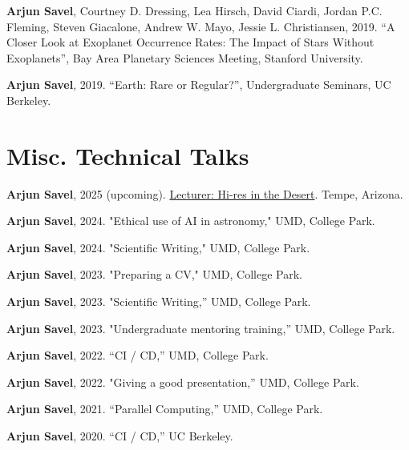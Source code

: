 \documentclass[letterpaper,10.5pt]{article}
\newcommand{\shorterSection}[1]{\vspace{-10pt}\section{#1}}
\begin{document}
\begin{list}{}{\cvlist}
\item[{\color{numcolor}\scriptsize2}] \textbf{Arjun Savel}, Courtney D. Dressing, Lea Hirsch, David Ciardi, Jordan P.C. Fleming, Steven Giacalone, Andrew W. Mayo, Jessie L. Christiansen, 2019. “A Closer Look at Exoplanet Occurrence Rates: The Impact of Stars Without Exoplanets”, Bay Area Planetary Sciences Meeting, Stanford University.

\item[{\color{numcolor}\scriptsize1}] \textbf{Arjun Savel}, 2019. “Earth: Rare or Regular?”, Undergraduate Seminars, UC Berkeley.

\end{list}

\shorterSection{Misc. Technical Talks}

\small
  \begin{list}{}{\cvlist}
    \item[{\color{numcolor}\scriptsize10}]
\textbf{Arjun Savel}, 2025 (upcoming). \href{https://sites.google.com/asu.edu/hi-res-in-the-desert}{Lecturer: Hi-res in the Desert}. Tempe, Arizona.
  \item[{\color{numcolor}\scriptsize9}]
\textbf{Arjun Savel}, 2024. "Ethical use of AI in astronomy," UMD, College Park.
  \item[{\color{numcolor}\scriptsize8}]
\textbf{Arjun Savel}, 2024. "Scientific Writing," UMD, College Park.
\item[{\color{numcolor}\scriptsize7}] 
\textbf{Arjun Savel}, 2023. "Preparing a CV," UMD, College Park.\item[{\color{numcolor}\scriptsize6}]
\textbf{Arjun Savel}, 2023. "Scientific Writing,” UMD, College Park.\item[{\color{numcolor}\scriptsize5}] \textbf{Arjun Savel}, 2023. "Undergraduate mentoring training,” UMD, College Park.
  \item[{\color{numcolor}\scriptsize4}] \textbf{Arjun Savel}, 2022. “CI / CD,” UMD, College Park.
  \item[{\color{numcolor}\scriptsize3}] \textbf{Arjun Savel}, 2022. "Giving a good presentation,” UMD, College Park.
  \item[{\color{numcolor}\scriptsize2}] \textbf{Arjun Savel}, 2021. “Parallel Computing,” UMD, College Park.
  \item[{\color{numcolor}\scriptsize1}] \textbf{Arjun Savel}, 2020. “CI / CD,” UC Berkeley.
  \end{list}
\end{document}
